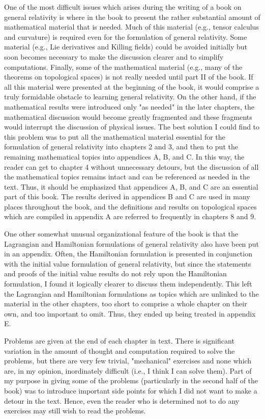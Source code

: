One of the most difficult issues which arises during the writing of a book on general relativity is where in the book to present the rather substantial amount of mathematical material that is needed. Much of this material (e.g., tensor calculus and curvature) is required even for the formulation of general relativity. Some material (e.g., Lie derivatives and Killing fields) could be avoided initially but soon becomes necessary to make the discussion clearer and to simplify computations. Finally, some of the mathematical material (e.g., many of the theorems on topological spaces) is not really needed until part II of the book. If all this material were presented at the beginning of the book, it would comprise a truly formidable obstacle to learning general relativity. On the other hand, if the mathematical results were introduced only "as needed" in the later chapters, the mathematical discussion would become greatly fragmented and these fragments would interrupt the discussion of physical issues. The best solution I could find to this problem was to put all the mathematical material essential for the formulation of general relativity into chapters 2 and 3, and then to put the remaining mathematical topics into appendices A, B, and C. In this way, the reader can get to chapter 4 without unnecessary detours, but the discussion of all the mathematical topics remains intact and can be referenced as needed in the text. Thus, it should be emphasized that appendices A, B, and C are an essential part of this book. The results derived in appendices B and C are used in many places throughout the book, and the definitions and results on topological spaces which are compiled in appendix A are referred to frequently in chapters 8 and 9.

One other somewhat unusual organizational feature of the book is that the Lagrangian and Hamiltonian formulations of general relativity also have been put in an appendix. Often, the Hamiltonian formulation is presented in conjunction with the initial value formulation of general relativity, but since the statements and proofs of the initial value results do not rely upon the Hamiltonian formulation, I found it logically clearer to discuss them independently. This left the Lagrangian and Hamiltonian formulations as topics which are unlinked to the material in the other chapters, too short to comprise a whole chapter on their own, and too important to omit. Thus, they ended up being treated in appendix E.

Problems are given at the end of each chapter in text. There is significant variation in the amount of thought and computation required to solve the problems, but there are very few trivial, "mechanical" exercises and none which are, in my opinion, inordinately difficult (i.e., I think I can solve them). Part of my purpose in giving some of the problems (particularly in the second half of the book) was to introduce important side points for which I did not want to make a detour in the text. Hence, even the reader who is determined not to do any exercises may still wish to read the problems.

